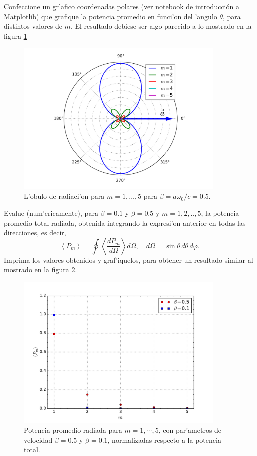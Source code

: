 \documentclass[11pt]{exam}
\begin{document}
\begin{parts}
\item Confeccione un gr'afico coordenadas polares (ver \href{https://github.com/PythonUdeC/CPC19/blob/master/04-Matplotlib.ipynb}{notebook de introducci\'on a Matplotlib}) que grafique la potencia promedio en funci'on del 'angulo $\theta$, para distintos valores de $m$. El resultado debiese ser algo parecido a lo mostrado en la figura \ref{TER2}
\begin{figure}[ht]
\centerline{\includegraphics[width=10cm]{figs/fig-mas.pdf}}
\caption{L'obulo de radiaci'on para $m=1,\dots,5$ para $\beta=a\omega_0/c=0.5$.}
\label{TER2}
\end{figure}
\item Evalue (num'ericamente), para $\beta =0.1$ y $\beta = 0.5$ y $m = 1,2,..,5$,  la potencia promedio total radiada, obtenida integrando la expresi'on anterior en todas las direcciones, es decir,
\begin{equation}
\left\langle P_{m}\right\rangle  = \oint\left\langle \frac{dP_{m}}{d\Omega}\right\rangle d\Omega, \quad d\Omega = \sin\theta\,d\theta\,d\varphi.
\end{equation}
Imprima los valores obtenidos y graf'iquelos, para obtener un resultado similar al mostrado en la figura \ref{TER3}.
\begin{figure}[ht]
\centerline{\includegraphics[width=10cm]{figs/fig-mas-potencia-total-comparacion.pdf}}
 \caption{Potencia promedio radiada para $m=1,\cdots,5$, con par'ametros de velocidad $\beta=0.5$ y  $\beta=0.1$, normalizadas respecto a la potencia total.}
\label{TER3}
\end{figure}
\end{parts}
\end{document}
